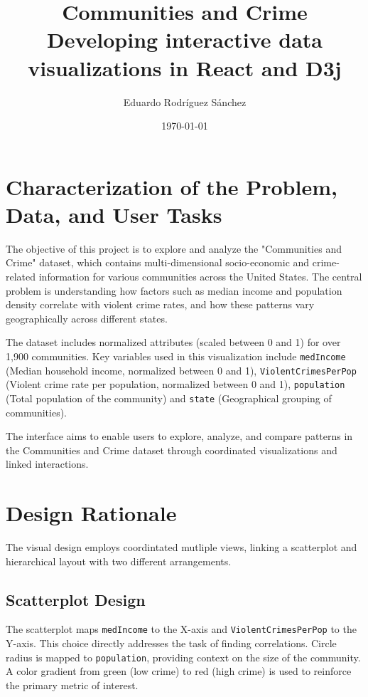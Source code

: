\documentclass[11pt]{article}
\title{%
  Communities and Crime\\
  \large Developing interactive data visualizations in React and D3j}
\author{Eduardo Rodríguez Sánchez}
\date{\today}
\begin{document}
\maketitle

\section{Characterization of the Problem, Data, and User Tasks}

The objective of this project is to explore and analyze the "Communities and Crime" dataset, which contains multi-dimensional socio-economic and crime-related information for various communities across the United States. The central problem is understanding how factors such as median income and population density correlate with violent crime rates, and how these patterns vary geographically across different states.

\bigskip

The dataset includes normalized attributes (scaled between 0 and 1) for over 1,900 communities. Key variables used in this visualization include \texttt{medIncome} (Median household income, normalized between 0 and 1), \texttt{ViolentCrimesPerPop} (Violent crime rate per population, normalized between 0 and 1), \texttt{population} (Total population of the community) and \texttt{state} (Geographical grouping of communities).

\bigskip

The interface aims to enable users to explore, analyze, and compare patterns in the Communities and Crime dataset through coordinated visualizations and linked interactions.

\section{Design Rationale}

The visual design employs coordintated mutliple views, linking a scatterplot and hierarchical layout with two different arrangements. 
\subsection{Scatterplot Design}
The scatterplot maps \texttt{medIncome} to the X-axis and \texttt{ViolentCrimesPerPop} to the Y-axis. This choice directly addresses the task of finding correlations. Circle radius is mapped to \texttt{population}, providing context on the size of the community. A color gradient from green (low crime) to red (high crime) is used to reinforce the primary metric of interest.
\end{document}
